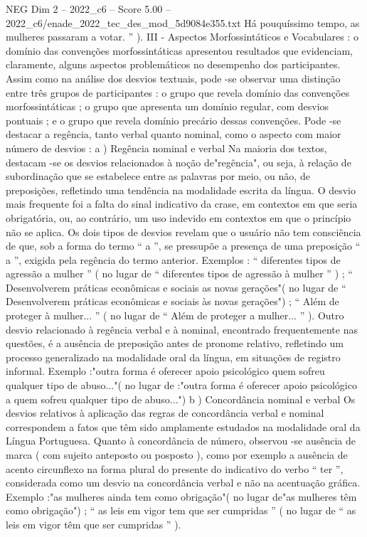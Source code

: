 \begin{textsample}{NEG Dim 2 – 2022\_c6 – Score 5.00 – 2022\_c6/enade\_2022\_tec\_des\_mod\_5d9084e355.txt}
Há pouquíssimo tempo, as mulheres passaram a votar. ” ).
III - Aspectos Morfossintáticos e Vocabulares : o domínio das convenções morfossintáticas apresentou resultados que evidenciam, claramente, alguns aspectos problemáticos no desempenho dos participantes.
Assim como na análise dos desvios textuais, pode -se observar uma distinção entre três grupos de participantes : o grupo que revela domínio das convenções morfossintáticas ; o grupo que apresenta um domínio regular, com desvios pontuais ; e o grupo que revela domínio precário dessas convenções.
Pode -se destacar a regência, tanto verbal quanto nominal, como o aspecto com maior número de desvios : a ) Regência nominal e verbal Na maioria dos textos, destacam -se os desvios relacionados à noção de"regência", ou seja, à relação de subordinação que se estabelece entre as palavras por meio, ou não, de preposições, refletindo uma tendência na modalidade escrita da língua.
O desvio mais frequente foi a falta do sinal indicativo da crase, em contextos em que seria obrigatória, ou, ao contrário, um uso indevido em contextos em que o princípio não se aplica.
Os dois tipos de desvios revelam que o usuário não tem consciência de que, sob a forma do termo “ a ”, se pressupõe a presença de uma preposição “ a ”, exigida pela regência do termo anterior.
Exemplos : “ diferentes tipos de agressão a mulher ” ( no lugar de “ diferentes tipos de agressão à mulher ” ) ; “ Desenvolverem práticas econômicas e sociais as novas gerações"( no lugar de “ Desenvolverem práticas econômicas e sociais às novas gerações") ; “ Além de proteger à mulher... ” ( no lugar de “ Além de proteger a mulher... ” ).
Outro desvio relacionado à regência verbal e à nominal, encontrado frequentemente nas questões, é a ausência de preposição antes de pronome relativo, refletindo um processo generalizado na modalidade oral da língua, em situações de registro informal.
Exemplo :"outra forma é oferecer apoio psicológico quem sofreu qualquer tipo de abuso..."( no lugar de :"outra forma é oferecer apoio psicológico a quem sofreu qualquer tipo de abuso...") b ) Concordância nominal e verbal Os desvios relativos à aplicação das regras de concordância verbal e nominal correspondem a fatos que têm sido amplamente estudados na modalidade oral da Língua Portuguesa.
Quanto à concordância de número, observou -se ausência de marca ( com sujeito anteposto ou posposto ), como por exemplo a ausência de acento circunflexo na forma plural do presente do indicativo do verbo “ ter ”, considerada como um desvio na concordância verbal e não na acentuação gráfica.
Exemplo :"as mulheres ainda tem como obrigação"( no lugar de"as mulheres têm como obrigação") ; “ as leis em vigor tem que ser cumpridas ” ( no lugar de “ as leis em vigor têm que ser cumpridas ” ).

\end{textsample}

